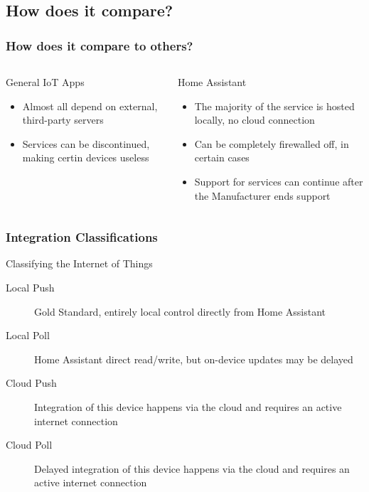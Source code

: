 \documentclass[aspectratio=169]{beamer}
\begin{document}
\subsection{How does it compare?}
\frame{\subsectionpage}
\begin{frame}[fragile]
  \frametitle{How does it compare to others?}
  \begin{columns}[]
    \begin{column}[T]{0.45\paperwidth}
      \Large{General IoT Apps}
      \begin{itemize}
        \item{Almost all depend on external, third-party servers}
        \item{Services can be discontinued, making certin devices useless}
      \end{itemize}
    \end{column}
    \begin{column}[T]{0.45\paperwidth}
      \Large{Home Assistant}
      \begin{itemize}
        \item{The majority of the service is hosted locally, no cloud connection}
        \item{Can be completely firewalled off, in certain cases}
        \item{Support for services can continue after the Manufacturer ends support}
      \end{itemize}
    \end{column}
  \end{columns}
\end{frame}
\begin{frame}[fragile]
  \frametitle{Integration Classifications}
  Classifying the Internet of Things
  \vfill
  \begin{description}%
    \item[Local Push]{Gold Standard, entirely local control directly from Home Assistant}
    \item[Local Poll]{Home Assistant direct read/write, but on-device updates may be delayed}
    \item[Cloud Push]{Integration of this device happens via the cloud and requires an active internet connection}
    \item[Cloud Poll]{Delayed integration of this device happens via the cloud and requires an active internet connection}
  \end{description}
\end{frame}
\end{document}
